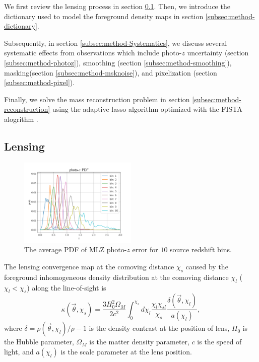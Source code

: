 \documentclass[twocolumn]{aastex62}
\begin{document}
We first review the lensing process in section \ref{subsec:method-delta2shear}.
Then, we introduce the dictionary used to model the foreground density maps in section \ref{subsec:method-dictionary}.

Subsequently, in section \ref{subsec:method-Systematics}, we discuss several systematic effects from observations which 
include photo-$z$ uncertainty (section \ref{subsec:method-photoz}),
smoothing (section \ref{subsec:method-smoothing}),
masking(section \ref{subsec:method-msknoise}),
and pixelization (section \ref{subsec:method-pixel}).

Finally, we solve the mass reconstruction problem in section \ref{subsec:method-reconstruction} using the adaptive lasso 
algorithm \citep{AdaLASSO-Zou2006} optimized with the FISTA alogrithm \citep{FISTA-Beck2009}.


\subsection{Lensing}
\label{subsec:method-delta2shear}

\begin{figure}[!t]
 \centering
 \includegraphics[width=0.5\textwidth]{mlz-poz.pdf}
 \caption{The average PDF of MLZ photo-$z$ error for $10$ source redshift bins.}\label{fig-pdfpz}
\end{figure}

The lensing convergence map at the comoving distance $\chi_s$ caused by the foreground inhomogeneous
density distribution at the comoving distance $\chi_l$ ($\chi_l< \chi_s$) along the line-of-sight is
\begin{equation}
\kappa(\vec{\theta},\chi_s)=\frac{3H_0^2\Omega_M}{2 c^2} \int_0^{\chi_s} d\chi_l \frac{\chi_l \chi_{sl}}{\chi_s}
\frac{\delta(\vec{\theta},\chi_l)}{a(\chi_l)},
\end{equation}
where $\delta=\rho(\vec{\theta},\chi_l)/\bar{\rho}-1$ is the density contrast
at the position of lens, $H_0$ is the Hubble parameter, $\Omega_M$ is the matter density parameter, $c$ is the speed
of light, and $a(\chi_l)$ is the scale parameter at the lens position.
\end{document}
